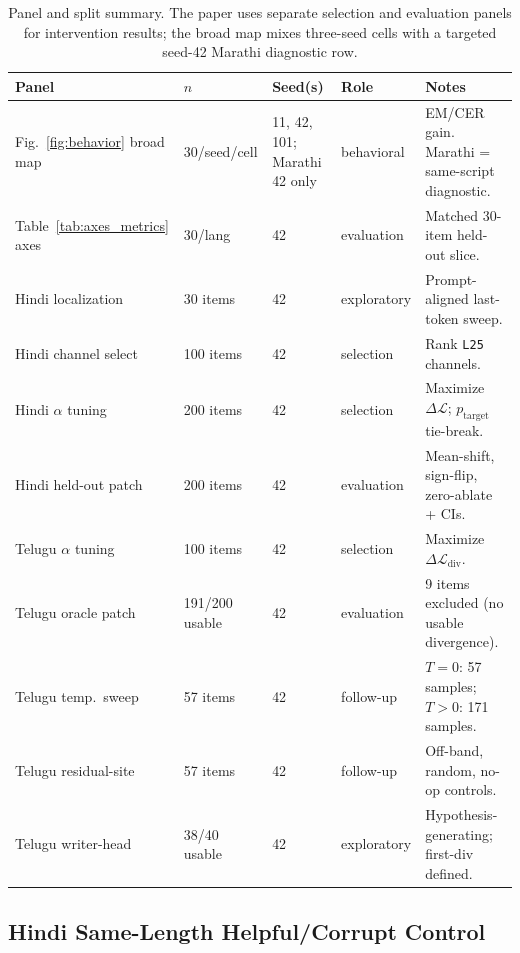 \documentclass{article}
\begin{document}
\begin{table}[t]
\centering
\scriptsize
\setlength{\tabcolsep}{4pt}
\begin{tabularx}{\textwidth}{p{2.8cm}p{2.0cm}p{1.6cm}p{1.8cm}X}
\toprule
\textbf{Panel} & \textbf{$n$} & \textbf{Seed(s)} & \textbf{Role} & \textbf{Notes} \\
\midrule
Fig.~\ref{fig:behavior} broad map & 30/seed/cell & 11, 42, 101; Marathi 42 only & behavioral & EM/CER gain. Marathi = same-script diagnostic. \\
Table~\ref{tab:axes_metrics} axes & 30/lang & 42 & evaluation & Matched 30-item held-out slice. \\
Hindi localization & 30 items & 42 & exploratory & Prompt-aligned last-token sweep. \\
Hindi channel select & 100 items & 42 & selection & Rank \texttt{L25} channels. \\
Hindi $\alpha$ tuning & 200 items & 42 & selection & Maximize $\Delta\mathcal{L}$; $p_{\mathrm{target}}$ tie-break. \\
Hindi held-out patch & 200 items & 42 & evaluation & Mean-shift, sign-flip, zero-ablate + CIs. \\
Telugu $\alpha$ tuning & 100 items & 42 & selection & Maximize $\Delta\mathcal{L}_{\mathrm{div}}$. \\
Telugu oracle patch & 191/200 usable & 42 & evaluation & 9 items excluded (no usable divergence). \\
Telugu temp.\ sweep & 57 items & 42 & follow-up & $T{=}0$: 57 samples; $T{>}0$: 171 samples. \\
Telugu residual-site & 57 items & 42 & follow-up & Off-band, random, no-op controls. \\
Telugu writer-head & 38/40 usable & 42 & exploratory & Hypothesis-generating; first-div defined. \\
\bottomrule
\end{tabularx}
\caption{Panel and split summary. The paper uses separate selection and evaluation panels for intervention results; the broad map mixes three-seed cells with a targeted seed-42 Marathi diagnostic row.}
\label{tab:panelsummary}
\end{table}

\subsection{Hindi Same-Length Helpful/Corrupt Control}\label{app:hindi_same_length}
\end{document}
